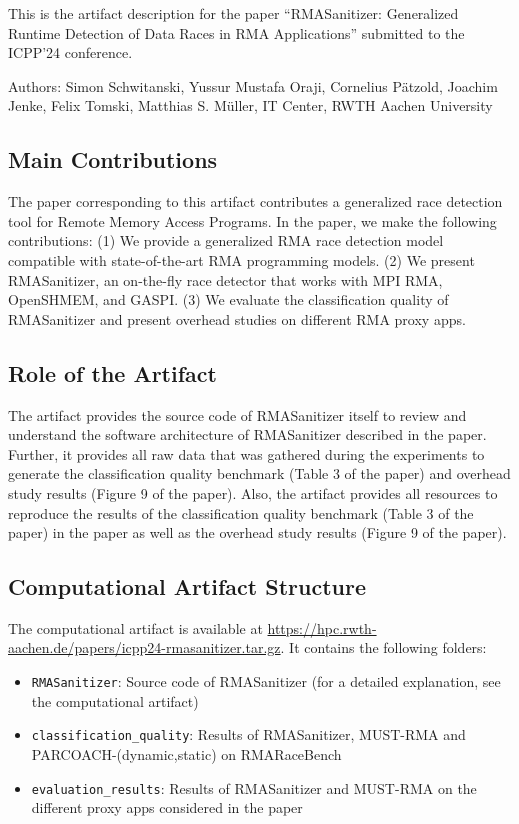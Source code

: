 \documentclass[twoside]{article}
\begin{document}
This is the artifact description for the paper ``RMASanitizer: Generalized Runtime Detection of Data Races in RMA Applications'' submitted to the ICPP'24 conference.

\noindent Authors: Simon Schwitanski, Yussur Mustafa Oraji, Cornelius Pätzold, Joachim Jenke, Felix Tomski, Matthias S. Müller, IT Center, RWTH Aachen University

\subsection*{Main Contributions}
The paper corresponding to this artifact contributes a generalized race detection tool for Remote Memory Access Programs. In the paper, we make the following contributions: (1) We provide a generalized RMA race detection model compatible with state-of-the-art RMA programming models. (2) We present RMASanitizer, an on-the-fly race detector that works with MPI RMA, OpenSHMEM, and GASPI. (3) We evaluate the classification quality of RMASanitizer and present overhead studies on different RMA proxy apps.

\subsection*{Role of the Artifact}
The artifact provides the source code of RMASanitizer itself to review and understand the software architecture of RMASanitizer described in the paper. Further, it provides all raw data that was gathered during the experiments to generate the classification quality benchmark (Table 3 of the paper) and overhead study results (Figure 9 of the paper). Also, the artifact provides all resources to reproduce the results of the classification quality benchmark (Table 3 of the paper) in the paper as well as the overhead study results (Figure 9 of the paper).


\subsection*{Computational Artifact Structure}
The computational artifact is available at \url{https://hpc.rwth-aachen.de/papers/icpp24-rmasanitizer.tar.gz}.
It contains the following folders:
\begin{itemize}
    \item \texttt{RMASanitizer}: Source code of RMASanitizer (for a detailed explanation, see the computational artifact)
    \item \texttt{classification\_quality}: Results of RMASanitizer, MUST-RMA and PARCOACH-(dynamic,static) on RMARaceBench
    \item \texttt{evaluation\_results}: Results of RMASanitizer and MUST-RMA on the different proxy apps considered in the paper
\end{itemize}
\end{document}
